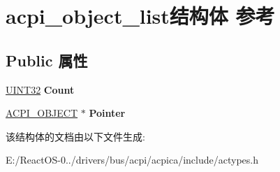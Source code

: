 \hypertarget{structacpi__object__list}{}\section{acpi\+\_\+object\+\_\+list结构体 参考}
\label{structacpi__object__list}
\subsection*{Public 属性}
\begin{DoxyCompactItemize}
\item 
\mbox{\label{structacpi__object__list_aa97736aa82f94ef1a9ce2c9df0138635}} 
\hyperlink{_processor_bind_8h_ae1e6edbbc26d6fbc71a90190d0266018}{U\+I\+N\+T32} {\bfseries Count}
\item 
\mbox{\label{structacpi__object__list_aa73d224866f7675af7b42b4ab6fabe1e}} 
\hyperlink{unionacpi__object}{A\+C\+P\+I\+\_\+\+O\+B\+J\+E\+CT} $\ast$ {\bfseries Pointer}
\end{DoxyCompactItemize}


该结构体的文档由以下文件生成\+:\begin{DoxyCompactItemize}
\item 
E\+:/\+React\+O\+S-\/0../drivers/bus/acpi/acpica/include/actypes.\+h\end{DoxyCompactItemize}
